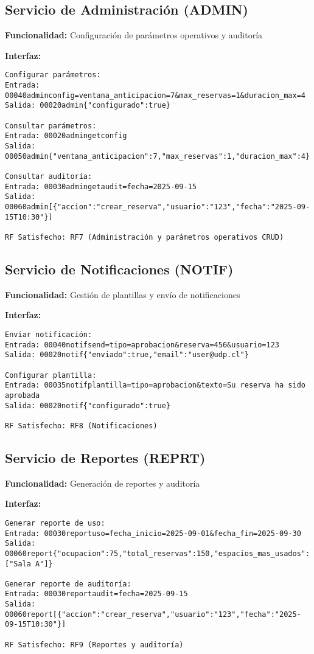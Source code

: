 \documentclass[a4paper, titlepage, 12pt]{article}
\begin{document}
\newpage
\subsection{Servicio de Administración (ADMIN)}
\textbf{Funcionalidad:} Configuración de parámetros operativos y auditoría

\textbf{Interfaz:}
\begin{verbatim}
Configurar parámetros:
Entrada: 00040adminconfig=ventana_anticipacion=7&max_reservas=1&duracion_max=4
Salida: 00020admin{"configurado":true}

Consultar parámetros:
Entrada: 00020admingetconfig
Salida: 00050admin{"ventana_anticipacion":7,"max_reservas":1,"duracion_max":4}

Consultar auditoría:
Entrada: 00030admingetaudit=fecha=2025-09-15
Salida: 00060admin[{"accion":"crear_reserva","usuario":"123","fecha":"2025-09-15T10:30"}]

RF Satisfecho: RF7 (Administración y parámetros operativos CRUD)
\end{verbatim}

\subsection{Servicio de Notificaciones (NOTIF)}
\textbf{Funcionalidad:} Gestión de plantillas y envío de notificaciones

\textbf{Interfaz:}
\begin{verbatim}
Enviar notificación:
Entrada: 00040notifsend=tipo=aprobacion&reserva=456&usuario=123
Salida: 00020notif{"enviado":true,"email":"user@udp.cl"}

Configurar plantilla:
Entrada: 00035notifplantilla=tipo=aprobacion&texto=Su reserva ha sido aprobada
Salida: 00020notif{"configurado":true}

RF Satisfecho: RF8 (Notificaciones)
\end{verbatim}

\newpage
\subsection{Servicio de Reportes (REPRT)}
\textbf{Funcionalidad:} Generación de reportes y auditoría

\textbf{Interfaz:}
\begin{verbatim}
Generar reporte de uso:
Entrada: 00030reportuso=fecha_inicio=2025-09-01&fecha_fin=2025-09-30
Salida: 00060report{"ocupacion":75,"total_reservas":150,"espacios_mas_usados":["Sala A"]}

Generar reporte de auditoría:
Entrada: 00030reportaudit=fecha=2025-09-15
Salida: 00060report[{"accion":"crear_reserva","usuario":"123","fecha":"2025-09-15T10:30"}]

RF Satisfecho: RF9 (Reportes y auditoría)
\end{verbatim}
\end{document}
